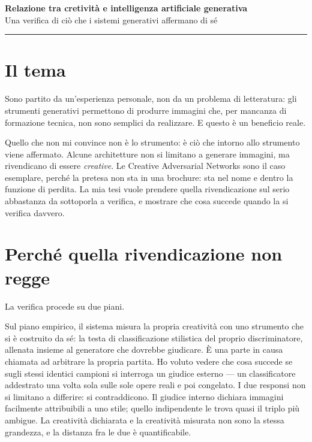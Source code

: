 \documentclass[10pt,a4paper]{article}
\begin{document}
\begin{center}

  {\LARGE\bfseries\color{acc} Relazione tra cretività e intelligenza artificiale generativa}\\[3pt]
  {\large Una verifica di ciò che i sistemi generativi affermano di sé}
\end{center}

\vspace{-3pt}
{\color{filetto}\rule{\linewidth}{0.8pt}}

\section{Il tema}

Sono partito da un'esperienza personale, non da un problema di letteratura: gli strumenti generativi permettono di produrre immagini che, per mancanza di formazione tecnica, non sono semplici da realizzare.
E questo è un beneficio reale.

Quello che non mi convince non è lo strumento: è ciò che intorno allo strumento viene affermato.
Alcune architetture non si limitano a generare immagini, ma rivendicano di essere \emph{creative}.
Le Creative Adversarial Networks sono il caso esemplare, perché la pretesa non sta in una brochure: sta nel nome e dentro la funzione di perdita.
La mia tesi vuole prendere quella rivendicazione sul serio abbastanza da sottoporla a verifica, e mostrare che cosa succede quando la si verifica davvero.

\section{Perché quella rivendicazione non regge}

La verifica procede su due piani.

Sul piano empirico, il sistema misura la propria creatività con uno strumento che si è costruito da sé: la testa di classificazione stilistica del proprio discriminatore, allenata insieme al generatore che dovrebbe giudicare.
È una parte in causa chiamata ad arbitrare la propria partita.
Ho voluto vedere che cosa succede se sugli stessi identici campioni si interroga un giudice esterno --- un classificatore addestrato una volta sola sulle sole opere reali e poi congelato.
I due responsi non si limitano a differire: si contraddicono.
Il giudice interno dichiara immagini facilmente attribuibili a uno stile; quello indipendente le trova quasi il triplo più ambigue.
La creatività dichiarata e la creatività misurata non sono la stessa grandezza, e la distanza fra le due è quantificabile.
\end{document}
